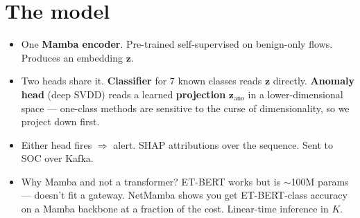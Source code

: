 \documentclass[11pt,a4paper]{article}
\begin{document}
\section{The model}
\begin{itemize}[leftmargin=*, itemsep=1pt, topsep=2pt]
  \item One \textbf{Mamba encoder}. Pre-trained self-supervised on benign-only flows. Produces an embedding $\mathbf{z}$.
  \item Two heads share it. \textbf{Classifier} for 7 known classes reads $\mathbf{z}$ directly. \textbf{Anomaly head} (deep SVDD) reads a learned \textbf{projection} $\mathbf{z}_\text{ano}$ in a lower-dimensional space --- one-class methods are sensitive to the curse of dimensionality, so we project down first.
  \item Either head fires $\Rightarrow$ alert. SHAP attributions over the sequence. Sent to SOC over Kafka.
  \item Why Mamba and not a transformer? ET-BERT works but is $\sim$100M params --- doesn't fit a gateway. NetMamba shows you get ET-BERT-class accuracy on a Mamba backbone at a fraction of the cost. Linear-time inference in $K$.
\end{itemize}
\end{document}
